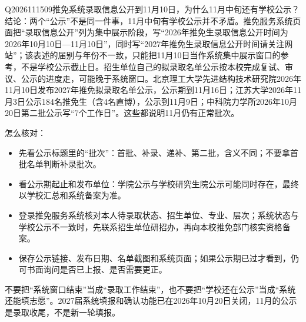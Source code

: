 \begin{qa}{Q2026111509}{推免系统录取信息公开到11月10日，为什么11月中旬还有学校公示？}
结论：两个“公示”不是同一件事，11月中旬有学校公示并不矛盾。推免服务系统页面把“录取信息公开”列为集中展示阶段，写“2026年推免生录取信息公开时间为2026年10月10日—11月10日”，同时写“2027年推免生录取信息公开时间请关注网站”；该表述的届别与年份不一致，只能把11月10日当作系统集中展示窗口的参考，不是学校公示截止日。招生单位自己的拟录取名单公示按本校完成复试、审议、公示的进度走，可能晚于系统窗口。北京理工大学先进结构技术研究院2026年11月10日发布2027年推免拟录取名单公示，公示期到11月16日；江苏大学2026年11月3日公示184名推免生（含4名直博），公示到11月9日；中科院力学所2026年10月20日第二批公示写“7个工作日”。这些都说明11月仍有正常批次。

怎么核对：

\begin{itemize}
\item 先看公示标题里的“批次”：首批、补录、递补、第二批，含义不同；不要拿首批名单判断补录批次。
\item 看公示期起止和发布单位：学院公示与学校研究生院公示可能同时存在，最终以学校汇总和系统备案为准。
\item 登录推免服务系统核对本人待录取状态、招生单位、专业、层次；系统状态与学校公示不一致时，先联系招生单位研招办，再向本校推免部门核实资格备案。
\item 保存公示链接、发布日期、名单截图和系统页面；如果公示期已过才看到，仍可书面询问是否已上报、是否需要更正。
\end{itemize}

不要把“系统窗口结束”当成“录取工作结束”，也不要把“学校还在公示”当成“系统还能填志愿”。2027届系统填报和确认功能已在2026年10月20日关闭，11月的公示是录取收尾，不是新一轮填报。
\end{qa}

